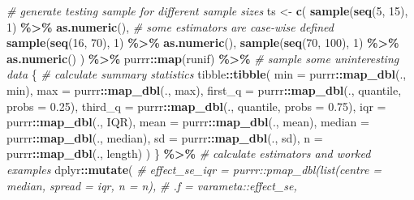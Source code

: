 \documentclass[
]{article}
\newenvironment{Shaded}{\begin{snugshade}}{\end{snugshade}}
\newcommand{\CommentTok}[1]{\textcolor[rgb]{0.56,0.35,0.01}{\textit{#1}}}
\newcommand{\DataTypeTok}[1]{\textcolor[rgb]{0.13,0.29,0.53}{#1}}
\newcommand{\DecValTok}[1]{\textcolor[rgb]{0.00,0.00,0.81}{#1}}
\newcommand{\FloatTok}[1]{\textcolor[rgb]{0.00,0.00,0.81}{#1}}
\newcommand{\KeywordTok}[1]{\textcolor[rgb]{0.13,0.29,0.53}{\textbf{#1}}}
\newcommand{\NormalTok}[1]{#1}
\newcommand{\OperatorTok}[1]{\textcolor[rgb]{0.81,0.36,0.00}{\textbf{#1}}}
\newcommand{\StringTok}[1]{\textcolor[rgb]{0.31,0.60,0.02}{#1}}
\begin{document}
\begin{Shaded}
\begin{Highlighting}[]
\CommentTok{\# generate testing sample for different sample sizes}
\NormalTok{ts <{-}}
\StringTok{  }\KeywordTok{c}\NormalTok{(}
    \KeywordTok{sample}\NormalTok{(}\KeywordTok{seq}\NormalTok{(}\DecValTok{5}\NormalTok{, }\DecValTok{15}\NormalTok{), }\DecValTok{1}\NormalTok{) }\OperatorTok{\%>\%}\StringTok{ }\KeywordTok{as.numeric}\NormalTok{(),}
    \CommentTok{\# some estimators are case{-}wise defined}
    \KeywordTok{sample}\NormalTok{(}\KeywordTok{seq}\NormalTok{(}\DecValTok{16}\NormalTok{, }\DecValTok{70}\NormalTok{), }\DecValTok{1}\NormalTok{) }\OperatorTok{\%>\%}\StringTok{ }\KeywordTok{as.numeric}\NormalTok{(),}
    \KeywordTok{sample}\NormalTok{(}\KeywordTok{seq}\NormalTok{(}\DecValTok{70}\NormalTok{, }\DecValTok{100}\NormalTok{), }\DecValTok{1}\NormalTok{) }\OperatorTok{\%>\%}\StringTok{ }\KeywordTok{as.numeric}\NormalTok{()}
\NormalTok{  ) }\OperatorTok{\%>\%}
\StringTok{  }\NormalTok{purrr}\OperatorTok{::}\KeywordTok{map}\NormalTok{(runif) }\OperatorTok{\%>\%}\StringTok{ }\CommentTok{\# sample some uninteresting data}
\StringTok{  }\NormalTok{\{}
    \CommentTok{\# calculate summary statistics}
\NormalTok{    tibble}\OperatorTok{::}\KeywordTok{tibble}\NormalTok{(}
      \DataTypeTok{min =}\NormalTok{ purrr}\OperatorTok{::}\KeywordTok{map\_dbl}\NormalTok{(., min),}
      \DataTypeTok{max =}\NormalTok{ purrr}\OperatorTok{::}\KeywordTok{map\_dbl}\NormalTok{(., max),}
      \DataTypeTok{first\_q =}\NormalTok{ purrr}\OperatorTok{::}\KeywordTok{map\_dbl}\NormalTok{(., quantile, }\DataTypeTok{probs =} \FloatTok{0.25}\NormalTok{),}
      \DataTypeTok{third\_q =}\NormalTok{ purrr}\OperatorTok{::}\KeywordTok{map\_dbl}\NormalTok{(., quantile, }\DataTypeTok{probs =} \FloatTok{0.75}\NormalTok{),}
      \DataTypeTok{iqr =}\NormalTok{ purrr}\OperatorTok{::}\KeywordTok{map\_dbl}\NormalTok{(., IQR),}
      \DataTypeTok{mean =}\NormalTok{ purrr}\OperatorTok{::}\KeywordTok{map\_dbl}\NormalTok{(., mean),}
      \DataTypeTok{median =}\NormalTok{ purrr}\OperatorTok{::}\KeywordTok{map\_dbl}\NormalTok{(., median),}
      \DataTypeTok{sd =}\NormalTok{ purrr}\OperatorTok{::}\KeywordTok{map\_dbl}\NormalTok{(., sd),}
      \DataTypeTok{n =}\NormalTok{ purrr}\OperatorTok{::}\KeywordTok{map\_dbl}\NormalTok{(., length)}
\NormalTok{    )}
\NormalTok{  \} }\OperatorTok{\%>\%}\StringTok{ }\CommentTok{\# calculate estimators and worked examples}
\StringTok{  }\NormalTok{dplyr}\OperatorTok{::}\KeywordTok{mutate}\NormalTok{(}
    \CommentTok{\# effect\_se\_iqr = purrr::pmap\_dbl(list(centre = median, spread = iqr, n = n),}
    \CommentTok{\#                          .f = varameta::effect\_se,}

\end{Highlighting}
\end{Shaded}
\end{document}
